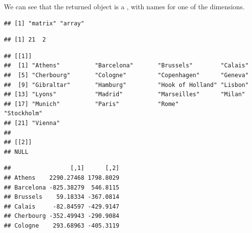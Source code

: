 \documentclass[krantz2]{krantz}\usepackage{knitr}
\begin{document}
\begin{knitrout}\footnotesize
{}\color{fgcolor}\begin{kframe}
\begin{alltt}
 \hlkwb{<-} 
\end{alltt}
\end{kframe}
\end{knitrout}

We can see that the returned object  is a , with names for one of the dimensions.

\begin{knitrout}\footnotesize
{}\color{fgcolor}\begin{kframe}
\begin{alltt}
\end{alltt}
\begin{verbatim}
## [1] "matrix" "array"
\end{verbatim}
\begin{alltt}
\end{alltt}
\begin{verbatim}
## [1] 21  2
\end{verbatim}
\begin{alltt}
\end{alltt}
\begin{verbatim}
## [[1]]
##  [1] "Athens"          "Barcelona"       "Brussels"        "Calais"         
##  [5] "Cherbourg"       "Cologne"         "Copenhagen"      "Geneva"         
##  [9] "Gibraltar"       "Hamburg"         "Hook of Holland" "Lisbon"         
## [13] "Lyons"           "Madrid"          "Marseilles"      "Milan"          
## [17] "Munich"          "Paris"           "Rome"            "Stockholm"      
## [21] "Vienna"         
## 
## [[2]]
## NULL
\end{verbatim}
\begin{alltt}
\end{alltt}
\begin{verbatim}
##                 [,1]      [,2]
## Athens    2290.27468 1798.8029
## Barcelona -825.38279  546.8115
## Brussels    59.18334 -367.0814
## Calais     -82.84597 -429.9147
## Cherbourg -352.49943 -290.9084
## Cologne    293.68963 -405.3119
\end{verbatim}
\end{kframe}
\end{knitrout}
\end{document}
